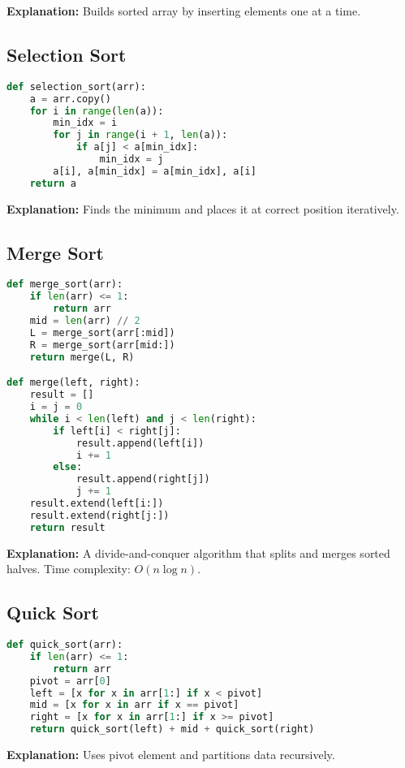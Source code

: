 \documentclass[14pt]{extarticle}
\begin{document}
\textbf{Explanation:} Builds sorted array by inserting elements one at a time.

\subsection*{Selection Sort}
\begin{lstlisting}[language=Python]
def selection_sort(arr):
    a = arr.copy()
    for i in range(len(a)):
        min_idx = i
        for j in range(i + 1, len(a)):
            if a[j] < a[min_idx]:
                min_idx = j
        a[i], a[min_idx] = a[min_idx], a[i]
    return a
\end{lstlisting}

\textbf{Explanation:} Finds the minimum and places it at correct position iteratively.

\newpage
\subsection*{Merge Sort}
\begin{lstlisting}[language=Python]
def merge_sort(arr):
    if len(arr) <= 1:
        return arr
    mid = len(arr) // 2
    L = merge_sort(arr[:mid])
    R = merge_sort(arr[mid:])
    return merge(L, R)

def merge(left, right):
    result = []
    i = j = 0
    while i < len(left) and j < len(right):
        if left[i] < right[j]:
            result.append(left[i])
            i += 1
        else:
            result.append(right[j])
            j += 1
    result.extend(left[i:])
    result.extend(right[j:])
    return result
\end{lstlisting}

\textbf{Explanation:} A divide-and-conquer algorithm that splits and merges sorted halves. Time complexity: $O(n \log n)$.

\subsection*{Quick Sort}
\begin{lstlisting}[language=Python]
def quick_sort(arr):
    if len(arr) <= 1:
        return arr
    pivot = arr[0]
    left = [x for x in arr[1:] if x < pivot]
    mid = [x for x in arr if x == pivot]
    right = [x for x in arr[1:] if x >= pivot]
    return quick_sort(left) + mid + quick_sort(right)
\end{lstlisting}

\textbf{Explanation:} Uses pivot element and partitions data recursively.
\end{document}
